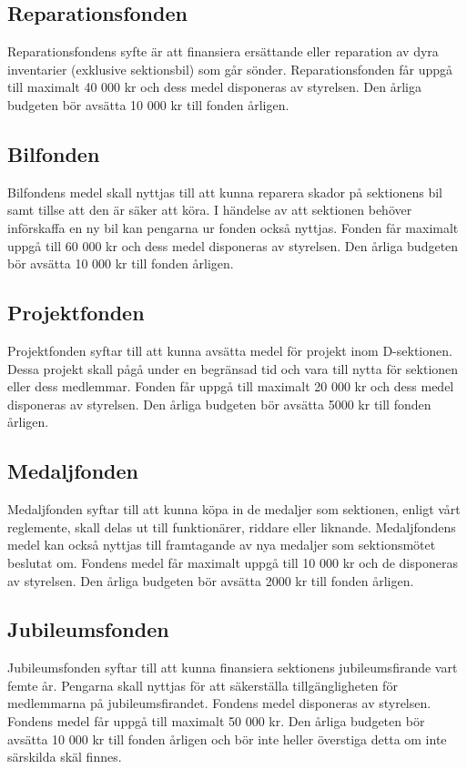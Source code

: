\documentclass{dsekprotokoll}
\begin{document}
\subsection{Reparationsfonden}
Reparationsfondens syfte är att finansiera ersättande eller reparation av dyra
inventarier (exklusive sektionsbil) som går sönder. Reparationsfonden får
uppgå till maximalt 40 000 kr och dess medel disponeras av styrelsen. Den årliga
budgeten bör avsätta 10 000 kr till fonden årligen.

\subsection{Bilfonden}
Bilfondens medel skall nyttjas till att kunna reparera skador på sektionens bil
samt tillse att den är säker att köra. I händelse av att sektionen behöver
införskaffa en ny bil kan pengarna ur fonden också nyttjas. Fonden får maximalt
uppgå till 60 000 kr och dess medel disponeras av styrelsen. Den årliga budgeten
bör avsätta 10 000 kr till fonden årligen.

\subsection{Projektfonden}
Projektfonden syftar till att kunna avsätta medel för projekt inom
D-sektionen. Dessa projekt skall pågå under en begränsad tid och vara till nytta
för sektionen eller dess medlemmar. Fonden får uppgå till maximalt 20 000 kr
och dess medel disponeras av styrelsen. Den årliga budgeten bör avsätta 5000
kr till fonden årligen.

\subsection{Medaljfonden}
Medaljfonden syftar till att kunna köpa in de medaljer som sektionen, enligt
vårt reglemente, skall delas ut till funktionärer, riddare eller
liknande. Medaljfondens medel kan också nyttjas till framtagande av nya medaljer
som sektionsmötet beslutat om. Fondens medel får maximalt uppgå till 10 000 kr
och de disponeras av styrelsen. Den årliga budgeten bör avsätta 2000 kr till
fonden årligen.

\subsection{Jubileumsfonden}
Jubileumsfonden syftar till att kunna finansiera sektionens jubileumsfirande
vart femte år.  Pengarna skall nyttjas för att säkerställa tillgängligheten för
medlemmarna på jubileumsfirandet. Fondens medel disponeras av styrelsen.
Fondens medel får uppgå till maximalt 50 000 kr.  Den årliga budgeten bör
avsätta 10 000 kr till fonden årligen och bör inte heller överstiga detta om
inte särskilda skäl finnes.
\end{document}

